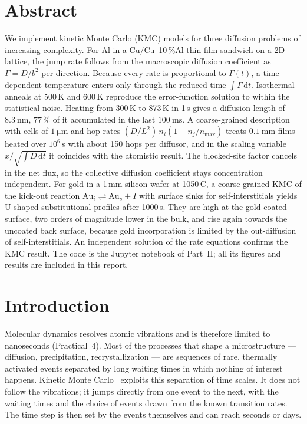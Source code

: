 \documentclass[11pt,a4paper]{article}
\numberwithin{equation}{section}
\theoremstyle{remark}
\begin{document}
\section*{Abstract}
  We implement kinetic Monte Carlo (KMC) models for three diffusion problems of increasing complexity.
  For Al in a Cu/Cu--10\,\%Al thin-film sandwich on a 2D lattice, the jump rate follows from the
  macroscopic diffusion coefficient as $\Gamma = D/b^2$ per direction. Because every rate is
  proportional to $\Gamma(t)$, a time-dependent temperature enters only through the reduced time
  $\int\Gamma\,\mathrm{d}t$. Isothermal anneals at 500\,K and 600\,K reproduce the error-function solution
  to within the statistical noise. Heating from 300\,K to 873\,K in 1\,s gives a diffusion length of
  $\SI{8.3}{\nano\metre}$, $77\,\%$ of it accumulated in the last $\SI{100}{\milli\second}$. A
  coarse-grained description with cells of $\SI{1}{\micro\metre}$ and hop rates
  $(D/L^2)\,n_i(1 - n_j/n_{\max})$ treats $\SI{0.1}{\milli\metre}$ films heated over $10^6$\,s with about
  150 hops per diffusor, and in the scaling variable $x/\sqrt{\int D\,\mathrm dt}$ it coincides with the
  atomistic result. The blocked-site factor cancels in the net flux, so the collective diffusion
  coefficient stays concentration independent. For gold in a 1\,mm silicon wafer at 1050\,\textdegree C,
  a coarse-grained KMC of the kick-out reaction $\mathrm{Au}_i \rightleftharpoons \mathrm{Au}_s + I$
  with surface sinks for self-interstitials yields U-shaped substitutional profiles after 1000\,s. They
  are high at the gold-coated surface, two orders of magnitude lower in the bulk, and rise again
  towards the uncoated back surface, because gold incorporation is limited by the out-diffusion of
  self-interstitials. An independent solution of the rate equations confirms the KMC result. The code
  is the Jupyter notebook of Part~II; all its figures and results are included in this report.

\tableofcontents
\clearpage

\section{Introduction}\label{sec:intro}

Molecular dynamics resolves atomic vibrations and is therefore limited to nanoseconds
(Practical~4). Most of the processes that shape a microstructure --- diffusion, precipitation,
recrystallization --- are sequences of rare, thermally activated events separated by long waiting
times in which nothing of interest happens. Kinetic Monte Carlo~\citep{script6, voter2007} exploits
this separation of time scales. It does not follow the vibrations; it jumps directly from one event to
the next, with the waiting times and the choice of events drawn from the known transition rates. The
time step is then set by the events themselves and can reach seconds or days.
\end{document}
